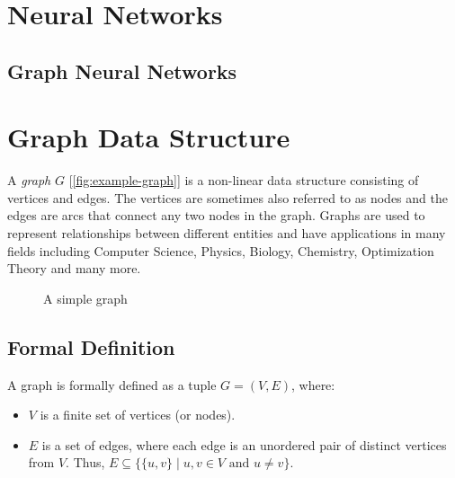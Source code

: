 \documentclass{article}
\begin{document}
\newpage
    
\newpage

\newpage
    \tableofcontents
\newpage

\section{Neural Networks}
\subsection{Graph Neural Networks}

\section{Graph Data Structure}
A \emph{graph} $G$ [\autoref{fig:example-graph}] is a non-linear data structure consisting of vertices and edges. The vertices are sometimes also referred to as nodes and the edges are arcs that connect any two nodes in the graph. Graphs are used to represent relationships between different entities and have applications in many fields including Computer Science, Physics, Biology, Chemistry, Optimization Theory and many more.

\begin{figure}[H]
    \centering
    \caption{A simple graph}
    \label{fig:example-graph}
\end{figure}

\subsection{Formal Definition}
A graph is formally defined as a tuple $G = (V, E)$, where:
\begin{itemize}
    \item $V$ is a finite set of vertices (or nodes).
    \item $E$ is a set of edges, where each edge is an unordered pair of distinct vertices from $V$. Thus, $E \subseteq \{\{u, v\} \mid u, v \in V \text{ and } u \neq v\}$.
\end{itemize}
\end{document}
